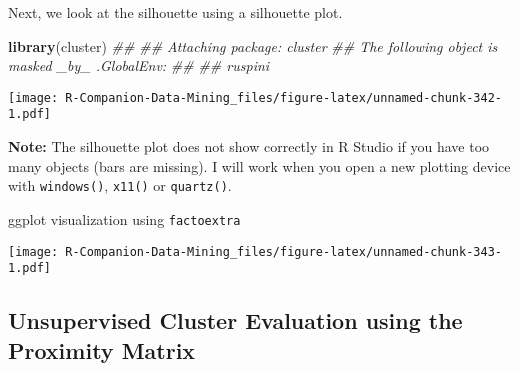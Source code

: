 \documentclass[
  notitlepage]{book}
\newenvironment{Shaded}{\begin{snugshade}}{\end{snugshade}}
\newcommand{\CommentTok}[1]{\textcolor[rgb]{0.56,0.35,0.01}{\textit{#1}}}
\newcommand{\KeywordTok}[1]{\textcolor[rgb]{0.13,0.29,0.53}{\textbf{#1}}}
\newcommand{\NormalTok}[1]{#1}
\newcommand{\OperatorTok}[1]{\textcolor[rgb]{0.81,0.36,0.00}{\textbf{#1}}}
\begin{document}
Next, we look at the silhouette using a
silhouette plot.

\begin{Shaded}
\begin{Highlighting}[]
\KeywordTok{library}\NormalTok{(cluster)}
\CommentTok{\#\# }
\CommentTok{\#\# Attaching package: \textquotesingle{}cluster\textquotesingle{}}
\CommentTok{\#\# The following object is masked \_by\_ \textquotesingle{}.GlobalEnv\textquotesingle{}:}
\CommentTok{\#\# }
\CommentTok{\#\#     ruspini}
\end{Highlighting}
\end{Shaded}

\begin{Shaded}
\end{Shaded}

\texttt{[image: R-Companion-Data-Mining\_files/figure-latex/unnamed-chunk-342-1.pdf]}

\textbf{Note:} The silhouette plot does not show correctly in R Studio if you
have too many objects (bars are missing). I will work when you open a
new plotting device with \texttt{windows()}, \texttt{x11()} or \texttt{quartz()}.

ggplot visualization using \texttt{factoextra}

\begin{Shaded}
\end{Shaded}

\texttt{[image: R-Companion-Data-Mining\_files/figure-latex/unnamed-chunk-343-1.pdf]}

\hypertarget{unsupervised-cluster-evaluation-using-the-proximity-matrix}{%
\subsection{Unsupervised Cluster Evaluation using the Proximity Matrix}\label{unsupervised-cluster-evaluation-using-the-proximity-matrix}}
\end{document}
